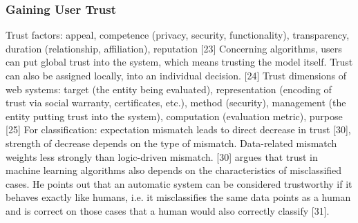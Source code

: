 \subsubsection{Gaining User Trust}
Trust factors: appeal, competence (privacy, security, functionality), transparency, duration (relationship, affiliation), reputation [23] \newline
Concerning algorithms, users can put global trust into the system, which means trusting the model itself. Trust can also be assigned locally, into an individual decision. [24] \newline
Trust dimensions of web systems: target (the entity being evaluated), representation (encoding of trust via social warranty, certificates, etc.), method (security), management (the entity putting trust into the system), computation (evaluation metric), purpose [25] \newline
For classification: expectation mismatch leads to direct decrease in trust [30], strength of decrease depends on the type of mismatch. Data-related mismatch weights less strongly than logic-driven mismatch. [30] \newline 
[31] argues that trust in machine learning algorithms also depends on the characteristics of misclassified cases. He points out that an automatic system can be considered trustworthy if it behaves exactly like humans, i.e. it misclassifies the same data points as a human and is correct on those cases that a human would also correctly classify [31].

